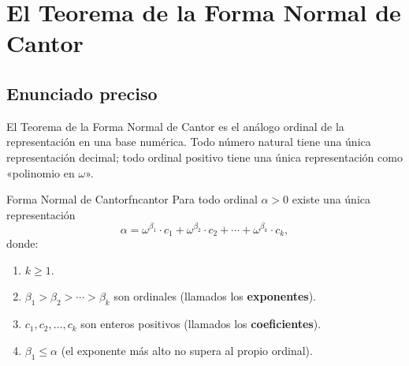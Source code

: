 \section{El Teorema de la Forma Normal de Cantor}

\subsection{Enunciado preciso}

El Teorema de la Forma Normal de Cantor es el análogo ordinal de la representación en una base numérica. Todo número natural tiene una única representación decimal; todo ordinal positivo tiene una única representación como «polinomio en $\omega$».

\begin{teorema}{Forma Normal de Cantor}{fncantor}
Para todo ordinal $\alpha > 0$ existe una única representación
\[
  \alpha = \omega^{\beta_1} \cdot c_1 + \omega^{\beta_2} \cdot c_2 + \cdots + \omega^{\beta_k} \cdot c_k,
\]
donde:
\begin{enumerate}[leftmargin=2em, label=(\roman*)]
  \item $k \geq 1$.
  \item $\beta_1 > \beta_2 > \cdots > \beta_k$ son ordinales (llamados los \textbf{exponentes}).
  \item $c_1, c_2, \ldots, c_k$ son enteros positivos (llamados los \textbf{coeficientes}).
  \item $\beta_1 \leq \alpha$ (el exponente más alto no supera al propio ordinal).
\end{enumerate}
\end{teorema}

